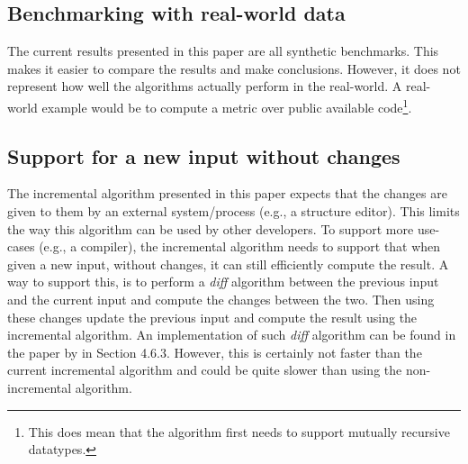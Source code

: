 \subsection{Benchmarking with real-world data}
The current results presented in this paper are all synthetic benchmarks. This makes it easier to compare the results and make conclusions. However, it does not represent how well the algorithms actually perform in the real-world. A real-world example would be to compute a metric over public available code\footnote{This does mean that the algorithm first needs to support mutually recursive datatypes.}.

\subsection{Support for a new input without changes}
The incremental algorithm presented in this paper expects that the changes are given to them by an external system/process (e.g., a structure editor). This limits the way this algorithm can be used by other developers. To support more use-cases (e.g., a compiler), the incremental algorithm needs to support that when given a new input, without changes, it can still efficiently compute the result. A way to support this, is to perform a \textit{diff} algorithm between the previous input and the current input and compute the changes between the two. Then using these changes update the previous input and compute the result using the incremental algorithm. An implementation of such \textit{diff} algorithm can be found in the paper  by \citeauthor{bransen2015incremental} in Section 4.6.3. However, this is certainly not faster than the current incremental algorithm and could be quite slower than using the non-incremental algorithm. 